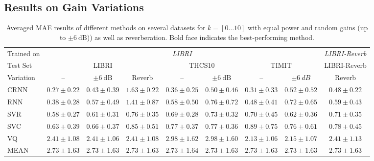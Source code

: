 \subsection{Results on Gain Variations}%
\label{ssec:exp_random_gains}
%
\begin{table}[h]
\tiny

\caption{Averaged MAE results of different methods on several datasets for \( k = [0 \ldots 10] \) with equal power and random gains (up to $\pm 6~\mbox{dB}$)) as well as reverberation. Bold face indicates the best-performing method.}
\begin{center}
\begin{tabular}{lcccccccc}
\toprule
Trained on & \multicolumn{7}{c}{\emph{LIBRI}} & \multicolumn{1}{c}{\emph{LIBRI-Reverb}} \\
\cmidrule(r){2-8} \cmidrule(r){9-9}
Test Set & \multicolumn{3}{c}{LIBRI} & \multicolumn{2}{c}{THCS10} & \multicolumn{2}{c}{TIMIT} & \multicolumn{1}{c}{LIBRI-Reverb} \\
\cmidrule(r){2-4} \cmidrule(r){5-6} \cmidrule(r){7-8} \cmidrule(r){9-9}
Variation &     – &     $\pm 6~\mbox{dB}$ & Reverb &  – &     $\pm 6~\mbox{dB}$ &     – &  $\pm 6~dB$ & Reverb \\
\midrule
CRNN    &  $\mathbf{0.27 \pm{0.22}}$ & $\mathbf{0.43 \pm{0.39}}$ & $1.63 \pm{0.22}$ & $\mathbf{0.36 \pm{0.25}}$  & $\mathbf{0.50 \pm{0.46}}$ & $\mathbf{0.31 \pm{0.33}}$ & $\mathbf{0.52 \pm{0.52}}$  &  $\mathbf{0.48 \pm{0.22}}$\\
RNN~\cite{stoeter17} & $0.38 \pm{0.28}$ & $0.57 \pm{0.49}$ & $1.41 \pm{0.87}$ & $0.58 \pm{0.50}$ &$0.76 \pm{0.72}$ & $0.48 \pm{0.41}$ & $0.72 \pm{0.65}$ & $0.59 \pm{0.43}$\\
SVR     &  $0.58 \pm{0.27}$ & $0.61 \pm{0.31}$ & $\mathbf{0.76 \pm{0.35}}$ & $0.69 \pm{0.28}$ &  $0.73 \pm{0.32}$ & $0.70 \pm{0.45}$ & $0.62 \pm{0.36}$ & $0.71 \pm{0.35}$ \\
SVC     &  $0.63 \pm{0.39}$ & $0.66 \pm{0.37}$ & $0.85 \pm{0.51}$ & $0.77 \pm{0.37}$ &  $0.77 \pm{0.36}$ & $0.89 \pm{0.75}$ & $0.76 \pm{0.61}$ & $0.78 \pm{0.45}$ \\
VQ \cite{sayoud10} &  $2.41 \pm{1.08}$ & $2.41 \pm{1.06}$ & $2.41 \pm{1.08}$ & $2.98 \pm{1.62}$ &  $2.98 \pm{1.60}$ & $2.13 \pm{1.06}$ & $2.15 \pm{1.07}$ & $2.41 \pm{1.13}$ \\
MEAN    &  $2.73 \pm{1.63}$ & $2.73 \pm{1.63}$ & $2.73 \pm{1.63}$ & $2.73 \pm{1.64}$ &  $2.73 \pm{1.63}$ & $2.73 \pm{1.63}$ & $2.73 \pm{1.63}$ & $2.73 \pm{1.63}$ \\
\bottomrule
\end{tabular}
\end{center}
\label{tab:expgainreverb}
\end{table}

